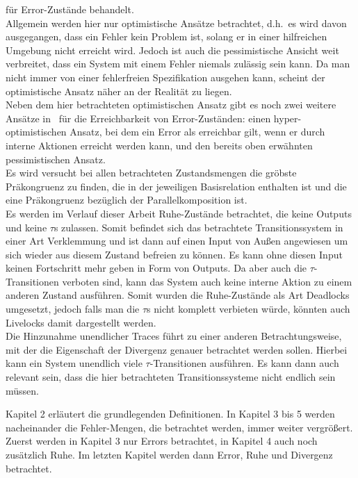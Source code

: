 für Error-Zustände behandelt.\\
Allgemein werden hier nur optimistische Ansätze betrachtet, d.h.\ es wird davon
ausgegangen, dass ein Fehler kein Problem ist, solang er in einer hilfreichen
Umgebung nicht erreicht wird. Jedoch ist auch die pessimistische Ansicht weit
verbreitet, dass ein System mit einem Fehler niemals zulässig sein kann. Da man
nicht immer von einer fehlerfreien Spezifikation ausgehen kann, scheint der
optimistische Ansatz näher an der Realität zu liegen.\\
Neben dem hier betrachteten optimistischen Ansatz gibt es noch zwei weitere
Ansätze in~\cite{Vogler2014EIO} für die Erreichbarkeit von Error-Zuständen:
einen hyper-optimistischen Ansatz, bei dem ein Error als erreichbar gilt, wenn
er durch interne Aktionen erreicht werden kann, und den bereits oben erwähnten
pessimistischen Ansatz.\\
Es wird versucht bei allen betrachteten Zustandsmengen die gröbste Präkongruenz zu
finden, die in der jeweiligen Basisrelation enthalten ist und die eine
Präkongruenz bezüglich der Parallelkomposition ist.\\
Es werden im Verlauf dieser Arbeit Ruhe-Zustände betrachtet, die keine Outputs
und keine $\tau$s zulassen. Somit befindet sich das betrachtete
Transitionssystem in einer Art Verklemmung und ist dann auf einen Input von
Außen angewiesen um sich wieder aus diesem Zustand befreien zu können. Es kann
ohne diesen Input keinen Fortschritt mehr geben in Form von Outputs. Da aber
auch die $\tau$-Transitionen verboten sind, kann das System auch keine interne
Aktion zu einem anderen Zustand
ausführen. Somit wurden die Ruhe-Zustände als Art Deadlocks umgesetzt,
jedoch falls man die $\tau$s nicht komplett verbieten würde, könnten auch
Livelocks damit dargestellt werden.\\
Die Hinzunahme unendlicher Traces führt zu einer anderen Betrachtungsweise, mit
der die Eigenschaft der Divergenz genauer betrachtet werden sollen. Hierbei
kann ein System unendlich viele $\tau$-Transitionen ausführen. Es kann dann
auch relevant sein, dass die hier betrachteten Transitionssysteme nicht endlich sein
müssen.

Kapitel 2 erläutert die grundlegenden Definitionen. In Kapitel 3 bis 5 werden
nacheinander die Fehler-Mengen, die betrachtet werden, immer weiter vergrößert.
Zuerst werden in Kapitel 3 nur Errors betrachtet, in Kapitel 4 auch noch
zusätzlich Ruhe. Im letzten Kapitel werden dann Error, Ruhe und Divergenz
betrachtet.
